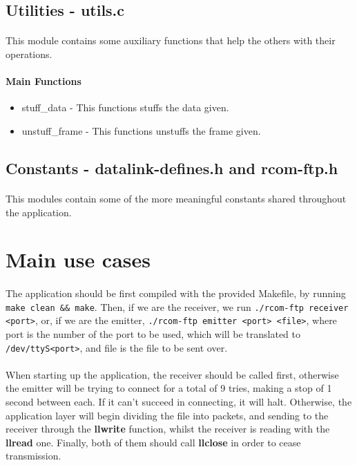 \documentclass[11pt]{article}
\begin{document}
\subsection{Utilities - utils.c}

\paragraph{}This module contains some auxiliary functions that help the others with their operations.

\paragraph{Main Functions}

\begin{itemize}
        \item{stuff\_data - This functions stuffs the data given.}
        \item{unstuff\_frame - This functions unstuffs the frame given.}
\end{itemize}

\subsection{Constants - datalink-defines.h and rcom-ftp.h}

\paragraph{}This modules contain some of the more meaningful constants shared throughout the application.

\section{Main use cases}

\paragraph{}The application should be first compiled with the provided Makefile, by running
\verb|make clean && make|. Then, if we are the receiver, we run \verb|./rcom-ftp receiver <port>|, or, if we
are the emitter, \verb|./rcom-ftp emitter <port> <file>|, where port is the number of the port to be used,
which will be translated to \verb|/dev/ttyS<port>|, and file is the file to be sent over.

\paragraph{} When starting up the application, the receiver should be called first, otherwise the emitter
will be trying to connect for a total of 9 tries, making a stop of 1 second between each. If it can't
succeed in connecting, it will halt. Otherwise, the application layer will begin dividing the file into
packets, and sending to the receiver through the \textbf{llwrite} function, whilst the receiver is reading
with the \textbf{llread} one. Finally, both of them should call \textbf{llclose} in order to cease
transmission.
\end{document}
